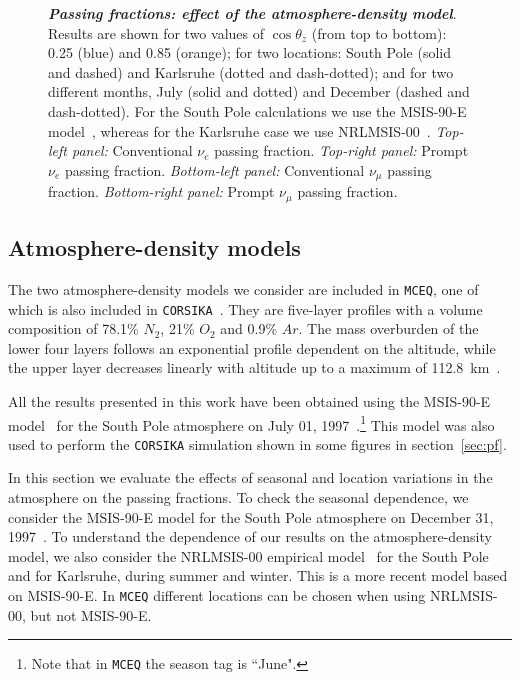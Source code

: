 \documentclass[aps,prd,showpacs,letterpaper,onecolumn,longbibliography,superscriptaddress,notitlepage,nofootinbib]{revtex4-1}%
\newcommand{\MCEq}{\texttt{MCE{\scriptsize Q}}}
\newcommand{\CORSIKA}{\texttt{CORSIKA}}
\begin{document}
\begin{figure}[h!]
{    }    
\caption{\textbf{\textit{Passing fractions: effect of the atmosphere-density model}}. Results are shown for two values of $\cos\theta_z$ (from top to bottom): 0.25 (blue) and 0.85 (orange); for two locations: South Pole (solid and dashed) and Karlsruhe (dotted and dash-dotted); and for two different months, July (solid and dotted) and December (dashed and dash-dotted). For the South Pole calculations we use the MSIS-90-E model~\cite{Labitzke:1985, Hedin:1991}, whereas for the Karlsruhe case we use NRLMSIS-00~\cite{Picone:2002}. \textit{Top-left panel:} Conventional $\nu_e$ passing fraction. \textit{Top-right panel:} Prompt $\nu_e$ passing fraction. \textit{Bottom-left panel:} Conventional $\nu_\mu$ passing fraction. \textit{Bottom-right panel:} Prompt $\nu_\mu$ passing fraction.} \vspace{1cm}
\label{fig:atmosphere-effect}
\end{figure}

\subsection{Atmosphere-density models}
\label{sec:atmosphere}

The two atmosphere-density models we consider are included in \MCEq, one of which is also included in \CORSIKA~\cite{Heck:2018}. They are five-layer profiles with a volume composition of 78.1\% $N_2$, 21\% $O_2$ and 0.9\% $Ar$. The mass overburden of the lower four layers follows an exponential profile dependent on the altitude, while the upper layer decreases linearly with altitude up to a maximum of 112.8~km~\cite{Heck:1998vt}. 

All the results presented in this work have been obtained using the MSIS-90-E model~\cite{Labitzke:1985, Hedin:1991} for the South Pole atmosphere on July 01, 1997~\cite{Heck:2018}.\footnote{Note that in \MCEq{} the season tag is ``June".} This model was also used to perform the \CORSIKA{} simulation shown in some figures in section~\ref{sec:pf}. 

In this section we evaluate the effects of seasonal and location variations in the atmosphere on the passing fractions. To check the seasonal dependence, we consider the MSIS-90-E model for the South Pole atmosphere on December 31, 1997~\cite{Heck:2018}. To understand the dependence of our results on the atmosphere-density model, we also consider the NRLMSIS-00 empirical model~\cite{Picone:2002} for the South Pole and for Karlsruhe, during summer and winter. This is a more recent model based on MSIS-90-E. In \MCEq{} different locations can be chosen when using NRLMSIS-00, but not MSIS-90-E.
\end{document}
